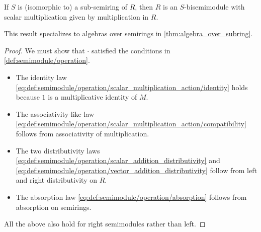 \begin{proposition}\label{thm:bisemimodule_over_submonoid}
  If \( S \) is (isomorphic to) a sub-semiring of \( R \), then \( R \) is an \( S \)-bisemimodule with scalar multiplication given by multiplication in \( R \).
\end{proposition}
\begin{comments}
  \item This result specializes to algebras over semirings in \cref{thm:algebra_over_subring}.
\end{comments}
\begin{proof}
  We must show that \( \cdot \) satisfied the conditions in \cref{def:semimodule/operation}.
  \begin{itemize}
    \item The identity law \eqref{eq:def:semimodule/operation/scalar_multiplication_action/identity} holds because \( 1 \) is a multiplicative identity of \( M \).
    \item The associativity-like law \eqref{eq:def:semimodule/operation/scalar_multiplication_action/compatibility} follows from associativity of multiplication.
    \item The two distributivity laws \eqref{eq:def:semimodule/operation/scalar_addition_distributivity} and \eqref{eq:def:semimodule/operation/vector_addition_distributivity} follow from left and right distributivity on \( R \).
    \item The absorption law \eqref{eq:def:semimodule/operation/absorption} follows from absorption on semirings.
  \end{itemize}

  All the above also hold for right semimodules rather than left.
\end{proof}

